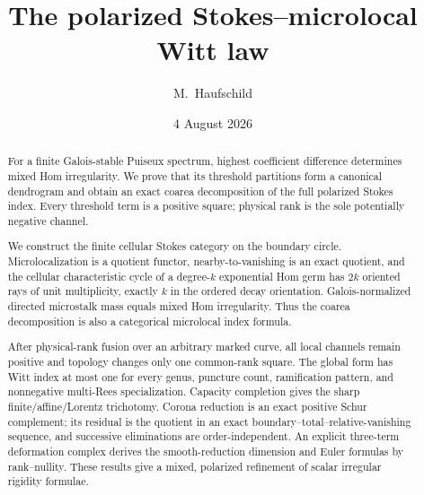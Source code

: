 \documentclass[11pt,a4paper]{amsart}
\theoremstyle{plain}
\theoremstyle{definition}
\begin{document}
\title[The Stokes--microlocal Witt law]{The polarized Stokes--microlocal Witt law}
\author{M.~Haufschild}
\address{Independent researcher}
\date{4 August 2026}


\begin{abstract}
For a finite Galois-stable Puiseux spectrum, highest coefficient difference determines mixed Hom
irregularity.  We prove that its threshold partitions form a canonical dendrogram and obtain an
exact coarea decomposition of the full polarized Stokes index.  Every threshold term is a positive
square; physical rank is the sole potentially negative channel.

We construct the finite cellular Stokes category on the boundary circle.  Microlocalization is a
quotient functor, nearby-to-vanishing is an exact quotient, and the cellular characteristic cycle
of a degree-$k$ exponential Hom germ has $2k$ oriented rays of unit multiplicity, exactly $k$ in
the ordered decay orientation.  Galois-normalized directed microstalk mass equals mixed Hom
irregularity.  Thus the coarea decomposition is also a categorical microlocal index formula.

After physical-rank fusion over an arbitrary marked curve, all local channels remain positive and
topology changes only one common-rank square.  The global form has Witt index at most one for every
genus, puncture count, ramification pattern, and nonnegative multi-Rees specialization.  Capacity
completion gives the sharp finite/affine/Lorentz trichotomy.  Corona reduction is an exact positive
Schur complement; its residual is the quotient in an exact boundary--total--relative-vanishing
sequence, and successive eliminations are order-independent.  An explicit three-term deformation
complex derives the smooth-reduction dimension and Euler formulas by rank--nullity.  These results
give a mixed, polarized refinement of scalar irregular rigidity formulae.
\end{abstract}

\maketitle
\end{document}
